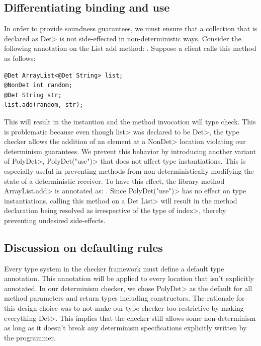 \subsection{Differentiating binding and use}\label{bindings-uses}

In order to provide soundness guarantees, we must ensure that a collection that is
declared as \<Det> is not side-effected in non-deterministic ways. Consider the following annotation 
on the List add method: .
Suppose a client calls this method as follows:
\begin{verbatim}
@Det ArrayList<@Det String> list;
@NonDet int random;
@Det String str;
list.add(random, str);
\end{verbatim}
This will result in the instantion  and
the method invocation will type check. This is problematic because even though \<list> was declared to be \<Det>,
the type checker allows the addition of an element at a \<NonDet> location violating our determinism guarantees.
We prevent this behavior by introducing another variant of \<PolyDet>, \<PolyDet("use")> that does not affect
type instantiations. This is especially useful in preventing methods from non-deterministically modifying the state
of a deterministic receiver. To have this effect, the library method \<ArrayList.add> is annotated as:
.
Since \<PolyDet("use")> has no effect on type instantiations, calling this method on a \<Det List>
will result in the method declaration being resolved as 
irrespective of the type of \<index>, thereby preventing undesired side-effects.

\subsection{Discussion on defaulting rules}\label{defaulting}
Every type system in the checker framework must define a default type annotation. This annotation will be applied
to every location that isn't explicitly annotated. In our determinism checker, we chose \<PolyDet> as the default for all 
method parameters and return types including constructors.
The rationale for this design choice was to not make our type checker too restrictive by making everything \<Det>.  This implies that
the checker still allows some non-determinism as long as it doesn't break any determinism specifications explicitly written by the programmer.

